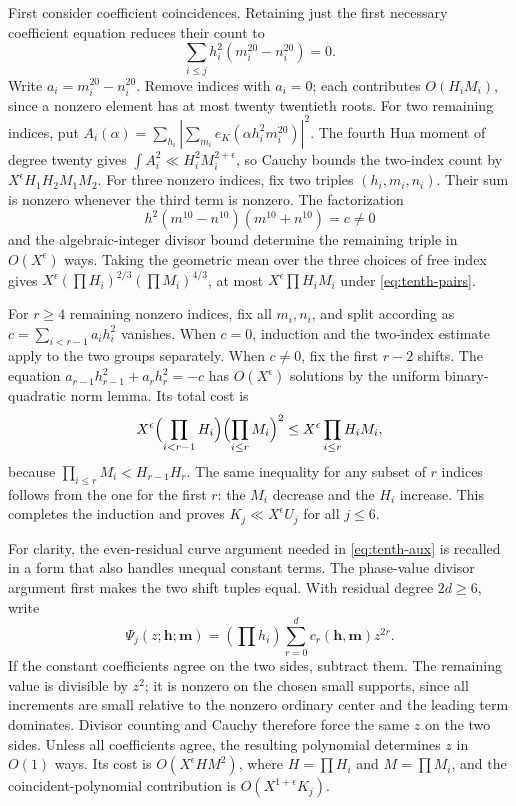 \documentclass[11pt,reqno]{amsart}
\numberwithin{equation}{section}
\theoremstyle{definition}
\begin{document}
First consider coefficient coincidences.  Retaining just the first necessary
coefficient equation reduces their count to
\[
              \sum_{i\le j}h_i^2(m_i^{20}-n_i^{20})=0.
\]
Write $a_i=m_i^{20}-n_i^{20}$.  Remove indices with $a_i=0$; each contributes
$O(H_iM_i)$, since a nonzero element has at most twenty twentieth roots.
For two remaining indices, put
$A_i(\alpha)=\sum_{h_i}|\sum_{m_i}e_K(\alpha h_i^2m_i^{20})|^2$.
The fourth Hua moment of degree twenty gives
$\int A_i^2\ll H_i^2M_i^{2+\epsilon}$, so Cauchy bounds the two-index count
by $X^\epsilon H_1H_2M_1M_2$.
For three nonzero indices, fix two triples $(h_i,m_i,n_i)$.  Their sum is
nonzero whenever the third term is nonzero.  The factorization
\[
       h^2(m^{10}-n^{10})(m^{10}+n^{10})=c\ne0
\]
and the algebraic-integer divisor bound determine the remaining triple in
$O(X^\epsilon)$ ways.  Taking the geometric mean over the three choices of
free index gives
$X^\epsilon(\prod H_i)^{2/3}(\prod M_i)^{4/3}$, at most
$X^\epsilon\prod H_iM_i$ under \eqref{eq:tenth-pairs}.

For $r\ge4$ remaining nonzero indices, fix all $m_i,n_i$, and split according
as $c=\sum_{i<r-1}a_ih_i^2$ vanishes.  When $c=0$, induction and the
two-index estimate apply to the two groups separately.  When $c\ne0$, fix
the first $r-2$ shifts.  The equation
$a_{r-1}h_{r-1}^2+a_rh_r^2=-c$ has $O(X^\epsilon)$ solutions by the uniform
binary-quadratic norm lemma.  Its total cost is
\[
 X^\epsilon\Bigl(\prod_{i<r-1}H_i\Bigr)
                   \Bigl(\prod_{i\le r}M_i\Bigr)^2
 \le X^\epsilon\prod_{i\le r}H_iM_i,
\]
because $\prod_{i\le r}M_i<H_{r-1}H_r$.
The same inequality for any subset of $r$ indices follows from the one for
the first $r$: the $M_i$ decrease and the $H_i$ increase.  This completes
the induction and proves $K_j\ll X^\epsilon U_j$ for all $j\le6$.

For clarity, the even-residual curve argument needed in
\eqref{eq:tenth-aux} is recalled in a form that also handles unequal constant
terms.  The phase-value divisor argument first makes the two shift tuples
equal.  With residual degree $2d\ge6$, write
\[
 \Psi_j(z;\mathbf h;\mathbf m)
    =(\prod h_i)\sum_{r=0}^{d}c_r(\mathbf h,\mathbf m)z^{2r}.
\]
If the constant coefficients agree on the two sides, subtract them.
The remaining value is divisible by $z^2$; it is nonzero on the chosen
small supports, since all increments are small relative to the nonzero
ordinary center and the leading term dominates.  Divisor counting and
Cauchy therefore force the same $z$ on the two sides.  Unless all
coefficients agree, the resulting polynomial determines $z$ in $O(1)$
ways.  Its cost is $O(X^\epsilon HM^2)$, where $H=\prod H_i$ and
$M=\prod M_i$, and the coincident-polynomial contribution is
$O(X^{1+\epsilon}K_j)$.
\end{document}

